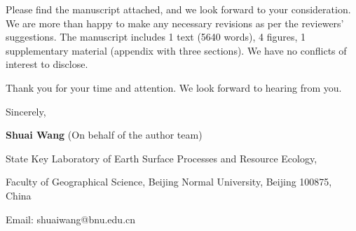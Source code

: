 \documentclass[11pt,a4paper,roman]{moderncv}
\begin{document}
Please find the manuscript attached, and we look forward to your consideration. We are more than happy to make any necessary revisions as per the reviewers' suggestions. The manuscript includes 1 text (5640 words), 4 figures, 1 supplementary material (appendix with three sections). We have no conflicts of interest to disclose.

Thank you for your time and attention. We look forward to hearing from you.


Sincerely,

\textbf{Shuai Wang} (On behalf of the author team)

State Key Laboratory of Earth Surface Processes and Resource Ecology,

Faculty of Geographical Science, Beijing Normal University, Beijing 100875, China

Email: shuaiwang@bnu.edu.cn


\end{document}
